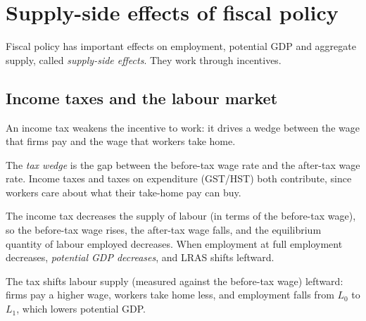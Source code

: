 \section{Supply-side effects of fiscal policy}

Fiscal policy has important effects on employment, potential GDP and aggregate supply,
called \emph{supply-side effects}. They work through incentives.

\subsection{Income taxes and the labour market}

An income tax weakens the incentive to work: it drives a wedge between the wage that
firms pay and the wage that workers take home.

\begin{definition}
The \emph{tax wedge} is the gap between the before-tax wage rate and the after-tax wage
rate. Income taxes and taxes on expenditure (GST/HST) both contribute, since workers care
about what their take-home pay can buy.
\end{definition}

The income tax decreases the supply of labour (in terms of the before-tax wage), so the
before-tax wage rises, the after-tax wage falls, and the equilibrium quantity of labour
employed decreases. When employment at full employment decreases, \emph{potential GDP
decreases}, and LRAS shifts leftward.

\begin{center}
\end{center}
The tax shifts labour supply (measured against the before-tax wage) leftward: firms pay a
higher wage, workers take home less, and employment falls from $L_0$ to $L_1$, which lowers
potential GDP.

